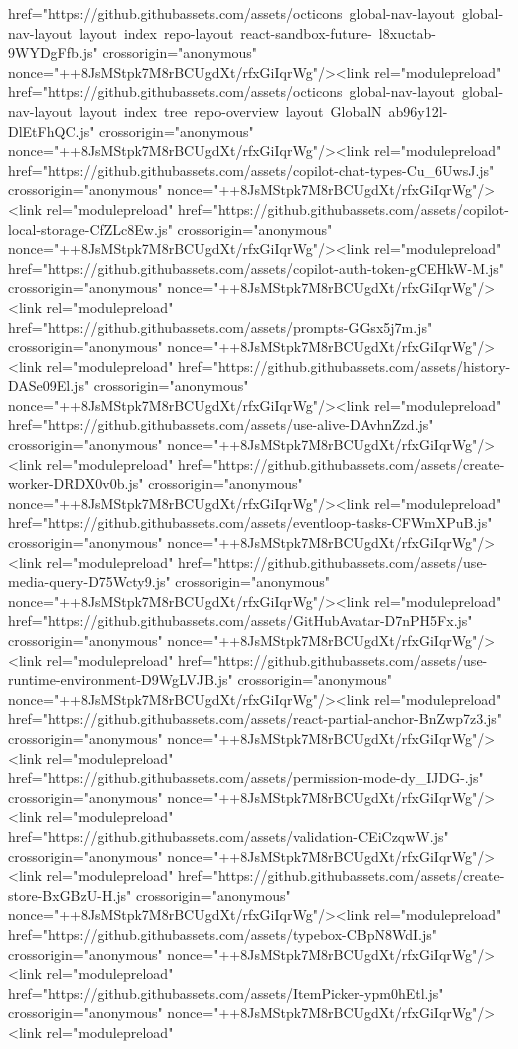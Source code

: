 href="https://github.githubassets.com/assets/octicons~global-nav-layout~global-nav-layout~layout~index~repo-layout~react-sandbox-future-~l8xuctab-9WYDgFfb.js" crossorigin="anonymous" nonce="++8JsMStpk7M8rBCUgdXt/rfxGiIqrWg"/><link rel="modulepreload" href="https://github.githubassets.com/assets/octicons~global-nav-layout~global-nav-layout~layout~index~tree~repo-overview~layout~GlobalN~ab96y12l-DlEtFhQC.js" crossorigin="anonymous" nonce="++8JsMStpk7M8rBCUgdXt/rfxGiIqrWg"/><link rel="modulepreload" href="https://github.githubassets.com/assets/copilot-chat-types-Cu_6UwsJ.js" crossorigin="anonymous" nonce="++8JsMStpk7M8rBCUgdXt/rfxGiIqrWg"/><link rel="modulepreload" href="https://github.githubassets.com/assets/copilot-local-storage-CfZLc8Ew.js" crossorigin="anonymous" nonce="++8JsMStpk7M8rBCUgdXt/rfxGiIqrWg"/><link rel="modulepreload" href="https://github.githubassets.com/assets/copilot-auth-token-gCEHkW-M.js" crossorigin="anonymous" nonce="++8JsMStpk7M8rBCUgdXt/rfxGiIqrWg"/><link rel="modulepreload" href="https://github.githubassets.com/assets/prompts-GGsx5j7m.js" crossorigin="anonymous" nonce="++8JsMStpk7M8rBCUgdXt/rfxGiIqrWg"/><link rel="modulepreload" href="https://github.githubassets.com/assets/history-DASe09El.js" crossorigin="anonymous" nonce="++8JsMStpk7M8rBCUgdXt/rfxGiIqrWg"/><link rel="modulepreload" href="https://github.githubassets.com/assets/use-alive-DAvhnZzd.js" crossorigin="anonymous" nonce="++8JsMStpk7M8rBCUgdXt/rfxGiIqrWg"/><link rel="modulepreload" href="https://github.githubassets.com/assets/create-worker-DRDX0v0b.js" crossorigin="anonymous" nonce="++8JsMStpk7M8rBCUgdXt/rfxGiIqrWg"/><link rel="modulepreload" href="https://github.githubassets.com/assets/eventloop-tasks-CFWmXPuB.js" crossorigin="anonymous" nonce="++8JsMStpk7M8rBCUgdXt/rfxGiIqrWg"/><link rel="modulepreload" href="https://github.githubassets.com/assets/use-media-query-D75Wcty9.js" crossorigin="anonymous" nonce="++8JsMStpk7M8rBCUgdXt/rfxGiIqrWg"/><link rel="modulepreload" href="https://github.githubassets.com/assets/GitHubAvatar-D7nPH5Fx.js" crossorigin="anonymous" nonce="++8JsMStpk7M8rBCUgdXt/rfxGiIqrWg"/><link rel="modulepreload" href="https://github.githubassets.com/assets/use-runtime-environment-D9WgLVJB.js" crossorigin="anonymous" nonce="++8JsMStpk7M8rBCUgdXt/rfxGiIqrWg"/><link rel="modulepreload" href="https://github.githubassets.com/assets/react-partial-anchor-BnZwp7z3.js" crossorigin="anonymous" nonce="++8JsMStpk7M8rBCUgdXt/rfxGiIqrWg"/><link rel="modulepreload" href="https://github.githubassets.com/assets/permission-mode-dy_IJDG-.js" crossorigin="anonymous" nonce="++8JsMStpk7M8rBCUgdXt/rfxGiIqrWg"/><link rel="modulepreload" href="https://github.githubassets.com/assets/validation-CEiCzqwW.js" crossorigin="anonymous" nonce="++8JsMStpk7M8rBCUgdXt/rfxGiIqrWg"/><link rel="modulepreload" href="https://github.githubassets.com/assets/create-store-BxGBzU-H.js" crossorigin="anonymous" nonce="++8JsMStpk7M8rBCUgdXt/rfxGiIqrWg"/><link rel="modulepreload" href="https://github.githubassets.com/assets/typebox-CBpN8WdI.js" crossorigin="anonymous" nonce="++8JsMStpk7M8rBCUgdXt/rfxGiIqrWg"/><link rel="modulepreload" href="https://github.githubassets.com/assets/ItemPicker-ypm0hEtl.js" crossorigin="anonymous" nonce="++8JsMStpk7M8rBCUgdXt/rfxGiIqrWg"/><link rel="modulepreload" 